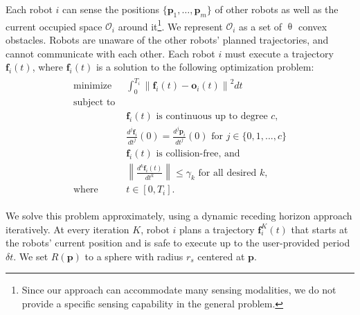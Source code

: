 \documentclass{svproc}
\newcommand{\Nora}[1] {\textbf{\textcolor{red}{#1}}}
\newcommand{\vp}{\mathbf{p}}
\newcommand{\vf}{\mathbf{f}}
\newcommand{\vo}{\mathbf{o}}
\newcommand{\cO}{\mathcal{O}}
\newcommand{\todo}[1]{\textbf{\textcolor{red}{TODO: #1}}}
\begin{document}
Each robot $i$ can sense the positions $\{\vp_1,\ldots,\vp_m\}$ of other robots as well as the current occupied space $\cO_i$ around it\footnote{Since our approach can accommodate many sensing modalities, we do not provide a specific sensing capability in the general problem.}.
We represent $\cO_i$ as a set of $\uptheta$ convex obstacles.
Robots are unaware of the other robots' planned trajectories, and cannot communicate with each other.
Each robot $i$ must execute a trajectory $\vf_i(t)$, where $\vf_i(t)$ is a solution to the following optimization problem:
\begin{align}
\begin{split}
    \text{minimize } & \int_{0}^{T_i}\left\|\vf_i(t)-\vo_i(t)\right\|^2 dt\\
    \text{subject to }& \\
    &\vf_i(t) \text{ is}\text{ continuous up to degree $c$},\\
    &\frac{d^j\vf_i}{dt^j}(0) = \frac{d^j\vp_i}{dt^j}(0)\text{ for } j\in\{0,1,...,c\}\\
    &\vf_i(t)\text{ is collision-free, and}\\ 
    &\left\|\frac{d^k \vf_i(t)}{dt^k}\right\| \leq \gamma_k\text{ for all desired $k$},\\
    \text{where } & t\in [0,T_i].
\end{split}
\label{eq:problem:opt}
\end{align}

We solve this problem approximately, using a dynamic receding horizon approach iteratively.
At every iteration $K$, robot $i$ plans a trajectory $\vf^{K}_i(t)$ that starts at the robots' current position and is safe to execute up to the user-provided period $\delta t$.
We set $R(\vp)$ to a sphere with radius $r_s$ centered at $\vp$.

\end{document}

